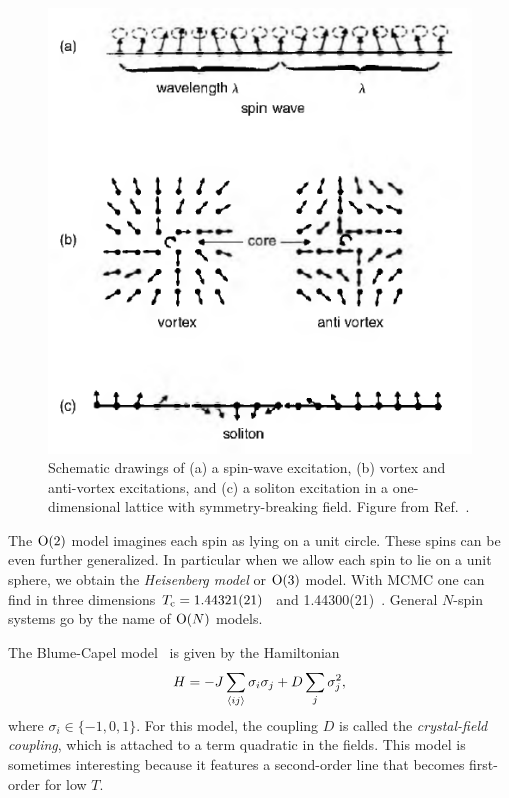 \begin{figure} 
\centering
\includegraphics[width=0.5\linewidth]{figs/vortex.pdf}
\caption{
Schematic drawings of (a) a spin-wave excitation,
(b) vortex and anti-vortex excitations, and (c)
a soliton excitation in a one-dimensional lattice
with symmetry-breaking field.
Figure from Ref.~\cite{landau_guide_2021}.
}
\label{fig:classicalExcitations}
\end{figure}

The $\operatorname{\text{O}}(2)$ model imagines each spin as lying on a unit circle. These spins can be
even further generalized. In particular when we allow each spin to lie on a unit
sphere, we obtain the {\it Heisenberg model}
or $\operatorname{\text{O}}(3)$ model. With MCMC one can find in three dimensions
$T_{\rm c}=1.44321(21)$~\cite{peczak_high-accuracy_1991}
and 1.44300(21)~\cite{holm_critical_1993}.
General $N$-spin systems go by the name of $\operatorname{\text{O}}(N)$ models.

The Blume-Capel 
model~\cite{blume_theory_1966,capel_possibility_1966} is given
by the Hamiltonian
\begin{equation}\label{eq:blume-capel}
H=-J\sum_{\ev{i j}} \sigma_i \sigma_j+D \sum_j\sigma_j^2,
\end{equation}
where $\sigma_i\in\{-1,0,1\}$. For this model, the coupling $D$ is called
the {\it crystal-field coupling}, which is attached to a term quadratic in the
fields. This model is sometimes interesting because it features a second-order
line that becomes first-order for low $T$.


